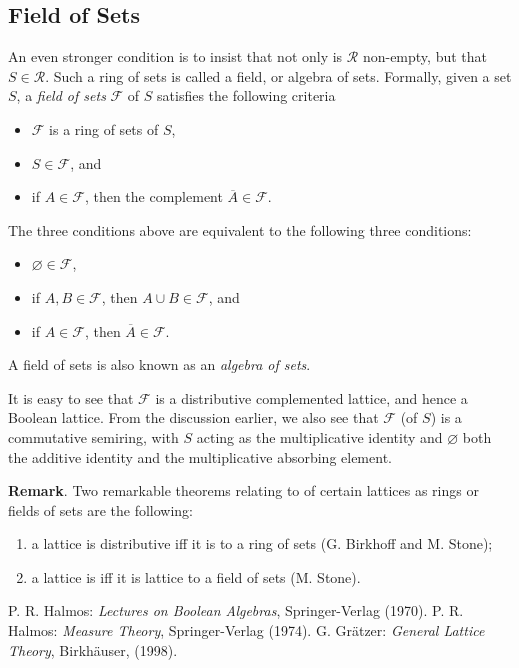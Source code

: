 \documentclass[12pt]{article}
\begin{document}
\subsection*{Field of Sets}
An even stronger condition is to insist that not only is $\mathcal{R}$ non-empty, but that $S\in\mathcal{R}$.  Such a ring of sets is called a field, or algebra of sets.  Formally, given a set $S$, a \emph{field of sets} $\mathcal{F}$ of $S$ satisfies the following criteria
\begin{itemize}
\item $\mathcal{F}$ is a ring of sets of $S$,
\item $S\in\mathcal{F}$, and
\item if $A\in\mathcal{F}$, then the complement $\overline{A}\in\mathcal{F}$.
\end{itemize}
The three conditions above are equivalent to the following three conditions:
\begin{itemize}
\item $\varnothing\in\mathcal{F}$,
\item if $A,B\in \mathcal{F}$, then $A\cup B\in \mathcal{F}$, and
\item if $A\in\mathcal{F}$, then $\overline{A}\in\mathcal{F}$.
\end{itemize}

A field of sets is also known as an \emph{algebra of sets}.

It is easy to see that $\mathcal{F}$ is a distributive complemented lattice, and hence a Boolean lattice.  From the discussion earlier, we also see that $\mathcal{F}$ (of $S$) is a commutative semiring, with $S$ acting as the multiplicative identity and $\varnothing$ both the additive identity and the multiplicative absorbing element.

\textbf{Remark}.  Two remarkable theorems relating to  of certain lattices as rings or fields of sets are the following: 
\begin{enumerate}
\item a lattice is distributive iff it is  to a ring of sets (G. Birkhoff and M. Stone); 
\item a lattice is  iff it is lattice  to a field of sets (M. Stone).
\end{enumerate}

\begin{thebibliography}{7}
 P. R. Halmos: {\em Lectures on Boolean Algebras}, Springer-Verlag (1970).
 P. R. Halmos: {\em Measure Theory}, Springer-Verlag (1974).
 G. Gr\"atzer: {\em General Lattice Theory}, Birkh\"auser, (1998).
\end{thebibliography}
\end{document}
